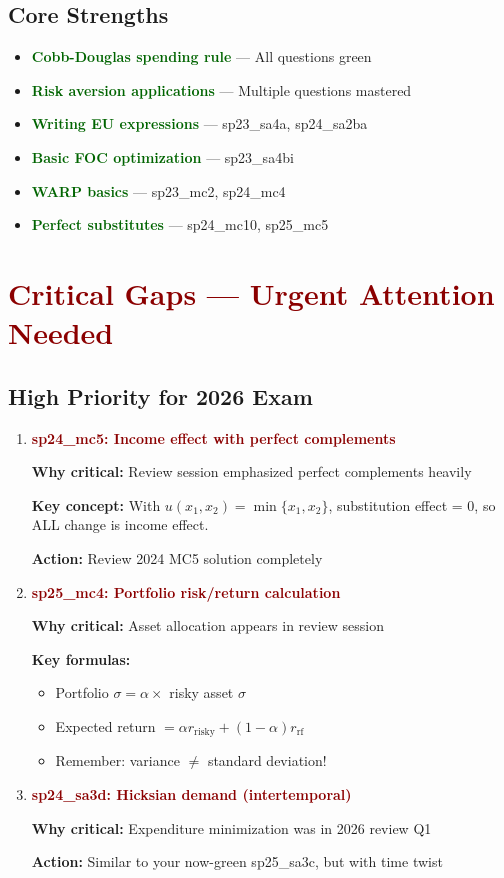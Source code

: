 \documentclass[11pt]{article}
\newcommand{\green}[1]{\textcolor{darkgreen}{\textbf{#1}}}
\newcommand{\red}[1]{\textcolor{darkred}{\textbf{#1}}}
\begin{document}
\subsection*{Core Strengths}

\begin{itemize}[leftmargin=*]
    \item \green{Cobb-Douglas spending rule} --- All questions green
    \item \green{Risk aversion applications} --- Multiple questions mastered
    \item \green{Writing EU expressions} --- sp23\_sa4a, sp24\_sa2ba
    \item \green{Basic FOC optimization} --- sp23\_sa4bi
    \item \green{WARP basics} --- sp23\_mc2, sp24\_mc4
    \item \green{Perfect substitutes} --- sp24\_mc10, sp25\_mc5
\end{itemize}

\section{\red{Critical Gaps --- Urgent Attention Needed}}

\subsection*{High Priority for 2026 Exam}

\begin{enumerate}[leftmargin=*]
    \item \red{sp24\_mc5: Income effect with perfect complements}

    \textbf{Why critical:} Review session emphasized perfect complements heavily

    \textbf{Key concept:} With $u(x_1, x_2) = \min\{x_1, x_2\}$, substitution effect = 0, so ALL change is income effect.

    \textbf{Action:} Review 2024 MC5 solution completely

    \item \red{sp25\_mc4: Portfolio risk/return calculation}

    \textbf{Why critical:} Asset allocation appears in review session

    \textbf{Key formulas:}
    \begin{itemize}
        \item Portfolio $\sigma = \alpha \times$ risky asset $\sigma$
        \item Expected return $= \alpha r_{\text{risky}} + (1-\alpha) r_{\text{rf}}$
        \item Remember: variance $\neq$ standard deviation!
    \end{itemize}

    \item \red{sp24\_sa3d: Hicksian demand (intertemporal)}

    \textbf{Why critical:} Expenditure minimization was in 2026 review Q1

    \textbf{Action:} Similar to your now-green sp25\_sa3c, but with time twist
\end{enumerate}
\end{document}
